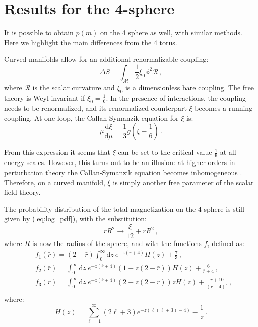 \documentclass[11pt,a4paper]{article}
\newcommand{\dd}{\mathrm{d}}
\begin{document}
\section{Results for the 4-sphere}
\label{sec:four_sphere}
It is possible to obtain $p(m)$ on the 4 sphere as well, with
similar methods. Here we highlight the main differences from the 4 torus.

Curved manifolds allow for an additional renormalizable coupling: 
\begin{equation}
    \Delta S = \int_{\mathcal{M}} \frac{1}{2}\xi_0 \phi^2 \mathcal{R}\,,
\end{equation}
where $\mathcal{R}$ is the scalar curvature and $\xi_0$ is a dimensionless bare
coupling.  The free theory is Weyl invariant if $\xi_0 = \frac{1}{6}$. In the
presence of interactions, the coupling needs to be renormalized, and its
renormalized counterpart $\xi$ becomes a running coupling. At one loop, the
Callan-Symanzik equation for $\xi$ is:
\begin{equation}
    \mu \frac{\dd \xi}{\dd \mu} =  \frac{1}{3} g \left(\xi - \frac{1}{6}\right)\,.
\end{equation}

From this expression it seems that $\xi$ can be set to the critical value
$\frac{1}{6}$ at all energy scales. However, this turns out to be an illusion:
at higher orders in perturbation theory the Callan-Symanzik equation
becomes inhomogeneous \cite{Brown1980}. Therefore, on a curved manifold, $\xi$
is simply another free parameter of the scalar field theory.

The probability distribution of the total magnetization on the 4-sphere is
still given by (\ref{eq:log_pdf}), with the substitution:
\begin{equation}
    rR^2 \to \frac{\xi}{12} + r R^2\,,
\end{equation}
where $R$ is now the radius of the sphere, and with the functions $f_i$ defined
as:
\begin{align}
    &f_1(\bar{r}) = (2 - \bar{r})\int_{0}^{\infty} \dd z\ e^{-z(\bar{r} + 4)} H(z) + \frac{7}{3}\,,\\
    &f_2(\bar{r}) = \int_{0}^{\infty} \dd z\ e^{-z(\bar{r} + 4)} 
    \left(1 + z (2 - \bar{r})\right) H(z) + \frac{6}{\bar{r} + 4}\,,\\
    &f_3(\bar{r}) = \int_{0}^{\infty} \dd z\ e^{-z(\bar{r} + 4)} 
    \left(2 + z (2 - \bar{r})\right)z H(z) + \frac{\bar{r} + 10 }{(\bar{r} + 4)^2}\,,\\
\end{align}
where:
\begin{equation}
    H(z) = \sum_{\ell = 1}^{\infty} (2\ell + 3)e^{-z (\ell(\ell + 3) - 4)} - \frac{1}{z}\,.
\end{equation}
\end{document}

